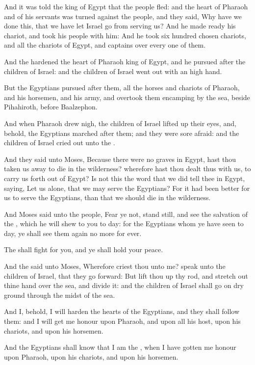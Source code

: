 \verse And it was told the king of Egypt that the people fled: and the
heart of Pharaoh and of his servants was turned against the people,
and they said, Why have we done this, that we have let Israel go from
serving us?  \verse And he made ready his chariot, and took his people
with him: \verse And he took six hundred chosen chariots, and all the
chariots of Egypt, and captains over every one of them.

\verse And the \LORD hardened the heart of Pharaoh king of Egypt, and he
pursued after the children of Israel: and the children of Israel went
out with an high hand.

\verse But the Egyptians pursued after them, all the horses and chariots
of Pharaoh, and his horsemen, and his army, and overtook them
encamping by the sea, beside Pihahiroth, before Baalzephon.

\verse And when Pharaoh drew nigh, the children of Israel lifted up
their eyes, and, behold, the Egyptians marched after them; and they
were sore afraid: and the children of Israel cried out unto the \LORD.

\verse And they said unto Moses, Because there were no graves in Egypt,
hast thou taken us away to die in the wilderness? wherefore hast thou
dealt thus with us, to carry us forth out of Egypt?  \verse Is not this
the word that we did tell thee in Egypt, saying, Let us alone, that we
may serve the Egyptians? For it had been better for us to serve the
Egyptians, than that we should die in the wilderness.

\verse And Moses said unto the people, Fear ye not, stand still, and
see the salvation of the \LORD, which he will shew to you to day: for
the Egyptians whom ye have seen to day, ye shall see them again no
more for ever.

\verse The \LORD shall fight for you, and ye shall hold your peace.

\verse And the \LORD said unto Moses, Wherefore criest thou unto me?
speak unto the children of Israel, that they go forward: \verse But
lift thou up thy rod, and stretch out thine hand over the sea, and
divide it: and the children of Israel shall go on dry ground through
the midst of the sea.

\verse And I, behold, I will harden the hearts of the Egyptians, and
they shall follow them: and I will get me honour upon Pharaoh, and
upon all his host, upon his chariots, and upon his horsemen.

\verse And the Egyptians shall know that I am the \LORD, when I have
gotten me honour upon Pharaoh, upon his chariots, and upon his
horsemen.

